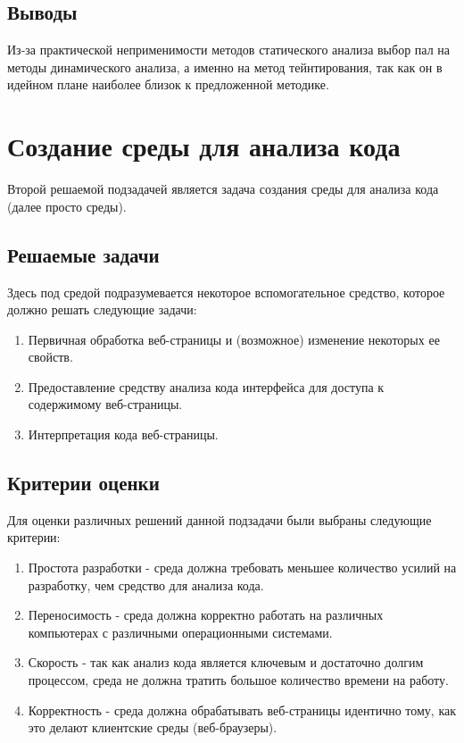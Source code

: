 \subsection{Выводы}
	Из-за практической неприменимости методов статического анализа выбор пал на методы динамического анализа, а именно на метод тейнтирования, так как он в идейном плане наиболее близок к предложенной методике.


\section{Создание среды для анализа кода}
Второй решаемой подзадачей является задача создания среды для анализа кода (далее просто среды).

\subsection{Решаемые задачи}
	Здесь под средой подразумевается некоторое вспомогательное средство, которое должно решать следующие задачи:

	\begin{enumerate}
		\item Первичная обработка веб-страницы и (возможное) изменение некоторых ее свойств.
		\item Предоставление средству анализа кода интерфейса для доступа к содержимому веб-страницы.
		\item Интерпретация кода веб-страницы.
	\end{enumerate}

\subsection{Критерии оценки}
	Для оценки различных решений данной подзадачи были выбраны следующие критерии:

	\begin{enumerate}
		\item Простота разработки - среда должна требовать меньшее количество усилий на разработку, чем средство для анализа кода.
		\item Переносимость - среда должна корректно работать на различных компьютерах с различными операционными системами.
		\item Скорость - так как анализ кода является ключевым и достаточно долгим процессом, среда не должна тратить большое количество времени на работу.
		\item Корректность - среда должна обрабатывать веб-страницы идентично тому, как это делают клиентские среды (веб-браузеры).
	\end{enumerate}
	\bigskip

